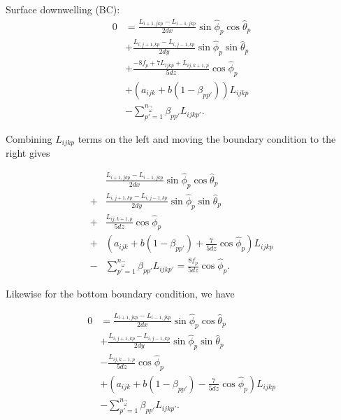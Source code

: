 Surface downwelling (BC):
\begin{equation*}
  \begin{aligned}
    0 &= \frac{L_{i+1,jkp}-L_{i-1,jkp}}{2dx}\sin\hat{\phi}_p\cos\hat{\theta}_p \\
    &+ \frac{L_{i,j+1,kp}-L_{i,j-1,kp}}{2dy}\sin\hat{\phi}_p\sin\hat{\theta}_p \\
    &+ \frac{-8f_p + 7L_{ijkp} + L_{ij,k+1,p}}{5dz}\cos\hat{\phi}_p \\
    &+ (a_{ijk}+b(1-\beta_{pp'}))L_{ijkp} \\
    &- \sum_{p'=1}^{n_{\vec{\omega}}} \beta_{pp'} L_{ijkp'}.
  \end{aligned}
\end{equation*}

Combining $L_{ijkp}$ terms on the left and moving the boundary condition to the
right gives

\begin{equation}
  \begin{aligned}
    &\frac{L_{i+1,jkp}-L_{i-1,jkp}}{2dx}\sin\hat{\phi}_p\cos\hat{\theta}_p \\
    + &\frac{L_{i,j+1,kp}-L_{i,j-1,kp}}{2dy}\sin\hat{\phi}_p\sin\hat{\theta}_p \\
    + &\frac{L_{ij,k+1,p}}{5dz}\cos\hat{\phi}_p \\
    + &(a_{ijk}+b(1-\beta_{pp'}) + \frac{7}{5dz} \cos\hat{\phi}_p)L_{ijkp} \\
    - &\sum_{p'=1}^{n_{\vec{\omega}}} \beta_{pp'} L_{ijkp'} = \frac{8f_p}{5dz} \cos\hat{\phi}_p.
  \end{aligned}
\end{equation}

Likewise for the bottom boundary condition, we have

\begin{equation}
  \begin{aligned}
    0 &= \frac{L_{i+1,jkp}-L_{i-1,jkp}}{2dx}\sin\hat{\phi}_p\cos\hat{\theta}_p \\
    &+ \frac{L_{i,j+1,kp}-L_{i,j-1,kp}}{2dy}\sin\hat{\phi}_p\sin\hat{\theta}_p \\
    &- \frac{L_{ij,k-1,p}}{5dz}\cos\hat{\phi}_p \\
    &+ (a_{ijk}+b(1-\beta_{pp'}) - \frac{7}{5dz}\cos\hat{\phi}_p)L_{ijkp} \\
    &- \sum_{p'=1}^{n_{\vec{\omega}}} \beta_{pp'} L_{ijkp'}.
  \end{aligned}
\end{equation}

